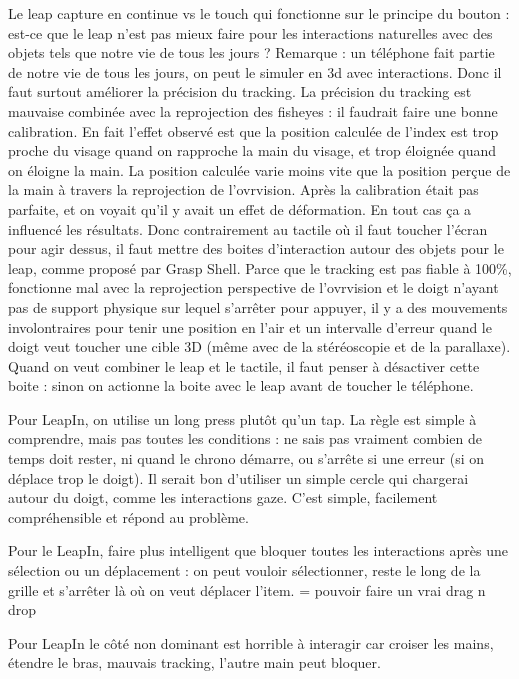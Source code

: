 Le leap capture en continue vs le touch qui fonctionne sur le principe du bouton : est-ce que le leap n'est pas mieux faire pour les interactions naturelles avec des objets tels que notre vie de tous les jours ? Remarque : un téléphone fait partie de notre vie de tous les jours, on peut le simuler en 3d avec interactions. Donc il faut surtout améliorer la précision du tracking.
La précision du tracking est mauvaise combinée avec la reprojection des fisheyes : il faudrait faire une bonne calibration. En fait l'effet observé est que la position calculée de l'index est trop proche du visage quand on rapproche la main du visage, et trop éloignée quand on éloigne la main. La position calculée varie moins vite que la position perçue de la main à travers la reprojection de l'ovrvision. Après la calibration était pas parfaite, et on voyait qu'il y avait un effet de déformation. En tout cas ça a influencé les résultats.
Donc contrairement au tactile où il faut toucher l'écran pour agir dessus, il faut mettre des boites d'interaction autour des objets pour le leap, comme proposé par Grasp Shell. Parce que le tracking est pas fiable à 100\%, fonctionne mal avec la reprojection perspective de l'ovrvision et le doigt n'ayant pas de support physique sur lequel s'arrêter pour appuyer, il y a des mouvements involontraires pour tenir une position en l'air et un intervalle d'erreur quand le doigt veut toucher une cible 3D (même avec de la stéréoscopie et de la parallaxe).
Quand on veut combiner le leap et le tactile, il faut penser à désactiver cette boite : sinon on actionne la boite avec le leap avant de toucher le téléphone.

Pour LeapIn, on utilise un long press plutôt qu'un tap. La règle est simple à comprendre, mais pas toutes les conditions : ne sais pas vraiment combien de temps doit rester, ni quand le chrono démarre, ou s'arrête si une erreur (si on déplace trop le doigt). Il serait bon d'utiliser un simple cercle qui chargerai autour du doigt, comme les interactions gaze. C'est simple, facilement compréhensible et répond au problème.

Pour le LeapIn, faire plus intelligent que bloquer toutes les interactions après une sélection ou un déplacement : on peut vouloir sélectionner, reste le long de la grille et s'arrêter là où on veut déplacer l'item. = pouvoir faire un vrai drag n drop

Pour LeapIn le côté non dominant est horrible à interagir car croiser les mains, étendre le bras, mauvais tracking, l'autre main peut bloquer.

